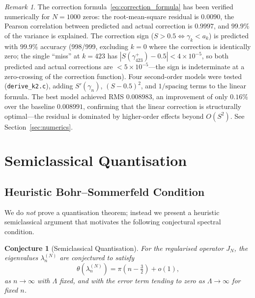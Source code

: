 \documentclass{pre-aomart}
\theoremstyle{plain}
\newtheorem{conjecture}[theorem]{Conjecture}
\theoremstyle{definition}
\theoremstyle{remark}
\newtheorem{remark}[theorem]{Remark}
\begin{document}
\begin{remark}
The correction formula~\eqref{eq:correction_formula} has been verified
numerically for $N=1000$ zeros: the root-mean-square residual is
\textbf{$0.0090$}, the Pearson correlation between predicted and actual
correction is \textbf{$0.9997$}, and $99.9\%$ of the variance is
explained.  The correction sign ($S > 0.5 \iff \gamma_k < a_k$) is
predicted with \textbf{$99.9\%$} accuracy (998/999, excluding $k=0$ where
the correction is identically zero; the single ``miss'' at $k=423$
has $|S(\gamma_{423}^+) - 0.5| < 4\times 10^{-5}$, so both predicted
and actual corrections are $< 5\times 10^{-5}$---the sign is
indeterminate at a zero-crossing of the correction function).
Four second-order models were tested (\texttt{derive\_k2.c}), adding
$S'(\gamma_n)$, $(S-0.5)^2$, and $1/\mathrm{spacing}$ terms to the
linear formula.  The best model achieved RMS $0.008983$, an improvement
of only $0.16\%$ over the baseline $0.008991$, confirming that the
linear correction is structurally optimal---the residual is dominated by
higher-order effects beyond $O(S^2)$.
See Section~\ref{sec:numerics}.
\end{remark}

\section{Semiclassical Quantisation}
\label{sec:quant}

\subsection{Heuristic Bohr--Sommerfeld Condition}

We do \emph{not} prove a quantisation theorem; instead we present a heuristic
semiclassical argument that motivates the following conjectural spectral
condition.

\begin{conjecture}[Semiclassical Quantisation]\label{conj:quant}
For the regularised operator $J_N$, the eigenvalues $\lambda_n^{(N)}$ are
conjectured to satisfy
\begin{equation}\label{eq:theta_quant}
\theta(\lambda_n^{(N)}) = \pi(n - \tfrac{3}{2}) + o(1),
\end{equation}
as $n \to \infty$ with $\Lambda$ fixed, and with the error term tending to zero
as $\Lambda \to \infty$ for fixed $n$.
\end{conjecture}
\end{document}
